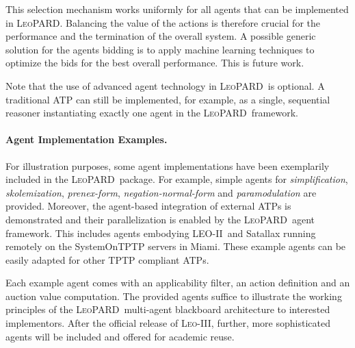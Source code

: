 \documentclass{llncs}
\def\sys{\mbox{\textsc{LeoPARD}}}
\def\leob{\mbox{\textsc{LEO-II}}}
\def\leoc{\mbox{\textsc{Leo-III}}}
\begin{document}
This selection mechanism works uniformly for all agents that can be
implemented in \sys. Balancing the value of the actions is therefore
crucial for the performance and the termination of the overall system. %
A possible generic solution for the agents bidding is to apply machine
learning techniques  to optimize the bids for the best overall
performance. This is future work.

Note that the use of  advanced agent technology in
\sys\ is optional. A traditional ATP can still be
implemented, for example, as a single, sequential reasoner instantiating exactly one
agent in the \sys\ framework.




\paragraph{Agent Implementation Examples.}
For illustration purposes, some agent implementations have been
exemplarily included in the \sys\ package. For example, simple agents
for \emph{simplification}, \emph{skolemization}, \emph{prenex-form},
\emph{negation-normal-form} and \emph{paramodulation} are
provided. Moreover, the agent-based integration of external ATPs is
demonstrated and their parallelization is enabled by the \sys\ agent
framework. This includes agents embodying \leob\ and Satallax
\cite{Satallax} running remotely on the
SystemOnTPTP \cite{DBLP:journals/jar/Sutcliffe09} servers in
Miami. These example agents can be easily adapted for other TPTP
compliant ATPs.

Each example agent comes with an applicability filter,
an action definition and an auction value
computation.  %
The provided agents suffice to illustrate the working principles of
the \sys\ multi-agent blackboard architecture to interested
implementors. After the official release of \leoc, further, more
sophisticated agents will be
included and offered for academic reuse.
\end{document}
